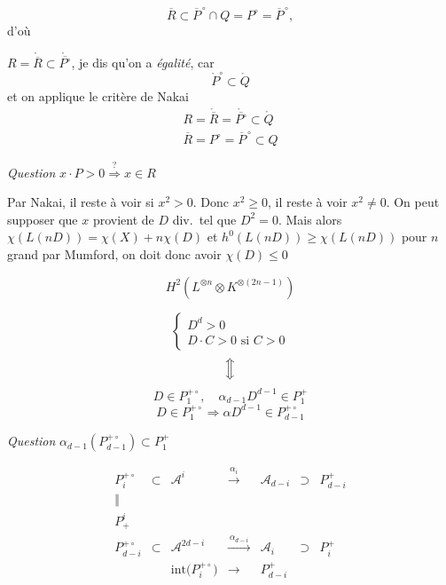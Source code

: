 \documentclass[11pt,a4paper]{article}
\begin{document}
\[
  \overline{R} \subset \overline{P}^{\,\circ} \cap Q = P^{\circ} =
  \overline{P}^{\,\circ},
\]
\struck{\ill{}} d'où


$R = \mathring{\overline{R}} \subset \mathring{\overline{P^{\circ}}}$, je dis
qu'on a \emph{égalité}, car
\[
  \mathring{P}^{\circ} \subset \mathring{Q}
\]
et on applique le critère de Nakai
\[
  \boxed{\begin{array}{l}
    R = \mathring{\overline{R}} = \mathring{\overline{P^{\circ}}} \subset
    \mathring{Q} \\
    \overline{R} = P^{\circ} = \overline{P}^{\,\circ} \subset Q
  \end{array}}
\]

\emph{Question} $x \cdot P > 0 \overset{?}{\Longrightarrow} x \in R$

Par Nakai, il reste à voir si $x^{2} > 0$. Donc $x^{2} \geqslant 0$, il reste
à voir $x^{2} \neq 0$. On peut supposer que $x$ provient de $D$ div.\ tel que
$D^{2} = 0$. Mais alors
$\chi(L(nD)) = \chi(X) + n\chi(D)$ et
$h^{0}(L(nD)) \geqslant \chi(L(nD))$ pour $n$ grand par Mumford, on doit donc
avoir $\chi(D) \leqslant 0$

\[
  H^{2}(L^{\otimes n} \otimes K^{\otimes(2n-1)})
\]

\[
  \boxed{\left\{\begin{array}{l} D^{d} > 0 \\ D \cdot C > 0 \text{ si }
  C > 0 \end{array}\right.}
\]
\[
  \Big\Updownarrow
\]
\[
  \boxed{\ D \in P_{1}^{+\circ},\quad \alpha_{d-1} D^{d-1} \in P_{1}^{+}\ }
\]
\[
  D \in P_{1}^{+\circ} \Longrightarrow \alpha D^{d-1} \in P_{d-1}^{+\circ}
\]

\emph{Question} $\alpha_{d-1}(P_{d-1}^{+\circ}) \subset P_{1}^{+}$

\[
  \boxed{\begin{array}{ccccccc}
    P_{i}^{+\circ} & \subset & \mathcal{A}^{i} & \xrightarrow{\ \alpha_{i}\ } &
    \mathcal{A}_{d-i} & \supset & P_{d-i}^{+} \\
    \Vert & & & & & & \\
    P^{i}_{+} & & & & & & \\[1ex]
    P_{d-i}^{+\circ} & \subset & \mathcal{A}^{2d-i} &
    \xrightarrow{\ \alpha_{d-i}\ } & \mathcal{A}_{i} & \supset & P_{i}^{+}
    \\[1ex]
    & & \mathrm{int}\bigl(P_{i}^{+\circ}\bigr) & \longrightarrow &
    P_{d-i}^{+} & &
  \end{array}}
\]
\end{document}
